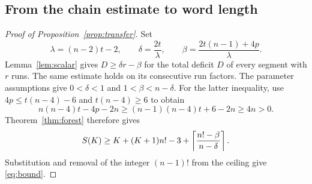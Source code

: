 \subsection{From the chain estimate to word length}

\begin{proof}[Proof of Proposition~\ref{prop:transfer}]
Set
\[
 \lambda=(n-2)t-2,\qquad
 \delta=\frac{2t}{\lambda},\qquad
 \beta=\frac{2t(n-1)+4p}{\lambda}.
\]
Lemma~\ref{lem:scalar} gives
$D\ge\delta r-\beta$ for the total deficit $D$ of every segment with
$r$ runs. The same estimate holds on its consecutive run factors.
The parameter assumptions give $0<\delta<1$ and $1<\beta<n-\delta$.
For the latter inequality, use $4p\le t(n-4)-6$ and
$t(n-4)\ge6$ to obtain
\[
 n(n-4)t-4p-2n\ge (n-1)(n-4)t+6-2n\ge4n>0.
\]
Theorem~\ref{thm:forest}
therefore gives
\begin{equation}\label{eq:forest}
 S(K)\ge K+(K+1)n!-3+
 \left\lceil \frac{n!-\beta}{n-\delta}\right\rceil.
\end{equation}
Substitution and removal of the integer $(n-1)!$ from the ceiling give
\eqref{eq:bound}.
\end{proof}
